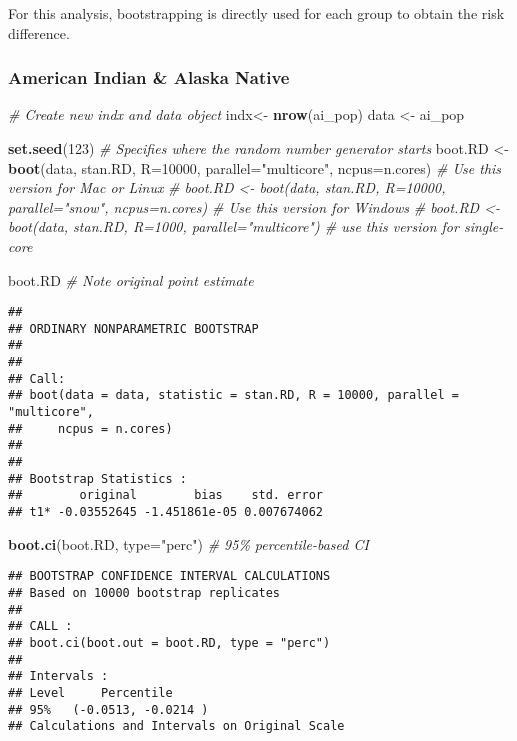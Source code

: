 \documentclass[
]{article}
\newenvironment{Shaded}{\begin{snugshade}}{\end{snugshade}}
\newcommand{\AttributeTok}[1]{\textcolor[rgb]{0.13,0.29,0.53}{#1}}
\newcommand{\CommentTok}[1]{\textcolor[rgb]{0.56,0.35,0.01}{\textit{#1}}}
\newcommand{\DecValTok}[1]{\textcolor[rgb]{0.00,0.00,0.81}{#1}}
\newcommand{\FunctionTok}[1]{\textcolor[rgb]{0.13,0.29,0.53}{\textbf{#1}}}
\newcommand{\NormalTok}[1]{#1}
\newcommand{\OtherTok}[1]{\textcolor[rgb]{0.56,0.35,0.01}{#1}}
\newcommand{\StringTok}[1]{\textcolor[rgb]{0.31,0.60,0.02}{#1}}
\begin{document}
For this analysis, bootstrapping is directly used for each group to
obtain the risk difference.

\subsubsection{American Indian \& Alaska
Native}\label{american-indian-alaska-native}

\begin{Shaded}
\begin{Highlighting}[]
\CommentTok{\# Create new indx and data object }
\NormalTok{indx}\OtherTok{\textless{}{-}} \FunctionTok{nrow}\NormalTok{(ai\_pop) }
\NormalTok{data }\OtherTok{\textless{}{-}}\NormalTok{ ai\_pop}

\FunctionTok{set.seed}\NormalTok{(}\DecValTok{123}\NormalTok{) }\CommentTok{\# Specifies where the random number generator starts}
\NormalTok{boot.RD }\OtherTok{\textless{}{-}} \FunctionTok{boot}\NormalTok{(data, stan.RD, }\AttributeTok{R=}\DecValTok{10000}\NormalTok{, }\AttributeTok{parallel=}\StringTok{"multicore"}\NormalTok{, }\AttributeTok{ncpus=}\NormalTok{n.cores) }\CommentTok{\# Use this version for Mac or Linux}
\CommentTok{\# boot.RD \textless{}{-} boot(data, stan.RD, R=10000, parallel="snow", ncpus=n.cores) \# Use this version for Windows}
\CommentTok{\# boot.RD \textless{}{-} boot(data, stan.RD, R=1000, parallel="multicore") \# use this version for single{-}core}

\NormalTok{boot.RD }\CommentTok{\# Note original point estimate}
\end{Highlighting}
\end{Shaded}

\begin{verbatim}
## 
## ORDINARY NONPARAMETRIC BOOTSTRAP
## 
## 
## Call:
## boot(data = data, statistic = stan.RD, R = 10000, parallel = "multicore", 
##     ncpus = n.cores)
## 
## 
## Bootstrap Statistics :
##        original        bias    std. error
## t1* -0.03552645 -1.451861e-05 0.007674062
\end{verbatim}

\begin{Shaded}
\begin{Highlighting}[]
\FunctionTok{boot.ci}\NormalTok{(boot.RD, }\AttributeTok{type=}\StringTok{"perc"}\NormalTok{) }\CommentTok{\# 95\% percentile{-}based CI}
\end{Highlighting}
\end{Shaded}

\begin{verbatim}
## BOOTSTRAP CONFIDENCE INTERVAL CALCULATIONS
## Based on 10000 bootstrap replicates
## 
## CALL : 
## boot.ci(boot.out = boot.RD, type = "perc")
## 
## Intervals : 
## Level     Percentile     
## 95%   (-0.0513, -0.0214 )  
## Calculations and Intervals on Original Scale
\end{verbatim}
\end{document}

